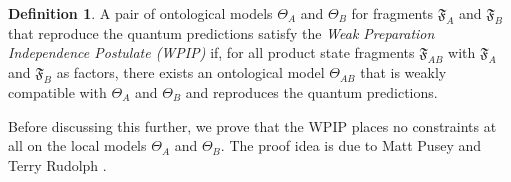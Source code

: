 \documentclass[DIV=calc,paper=a4,fontsize=11pt,twocolumn]{scrartcl} %
\theoremstyle{definition}
\newtheorem{definition}{Definition}[section]
\theoremstyle{plain}
\begin{document}
\begin{definition}
A pair of ontological models $\Theta_A$ and $\Theta_B$ for fragments
$\mathfrak{F}_A$ and $\mathfrak{F}_B$ that reproduce the quantum
predictions satisfy the \emph{Weak Preparation Independence
Postulate (WPIP)} if, for all product state fragments
$\mathfrak{F}_{AB}$ with $\mathfrak{F}_A$ and $\mathfrak{F}_B$ as
factors, there exists an ontological model $\Theta_{AB}$ that is
weakly compatible with $\Theta_A$ and $\Theta_B$ and reproduces the
quantum predictions.
\end{definition}

Before discussing this further, we prove that the WPIP places no
constraints at all on the local models $\Theta_A$ and $\Theta_B$.  The
proof idea is due to Matt Pusey and Terry Rudolph \cite{Pusey2013}.
\end{document}
